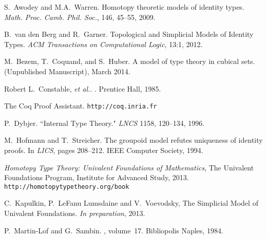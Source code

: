 \documentclass[11pt]{article}
\theoremstyle{remark}
\theoremstyle{definition}
\begin{document}

\begin{thebibliography}{300}

S.~Awodey and M.A.~Warren. Homotopy theoretic models of identity types. \emph{Math. Proc. Camb. Phil. Soc.}, 146, 45--55, 2009.

B.~van den Berg and R.~Garner. Topological and Simplicial Models of Identity Types. \emph{ACM Transactions on Computational Logic}, 13:1, 2012.

M.~Bezem, T.~Coquand, and S.~Huber.
\newblock A model of type theory in cubical sets.
\newblock (Unpublished Manuscript), March 2014.

Robert L.~Constable, \textit{et al.}.
.
\newblock Prentice Hall, 1985.

The Coq Proof Assistant.
\newblock \texttt{http://coq.inria.fr}

P.~Dybjer. ``Internal Type Theory." \emph{LNCS} 1158, 120--134, 1996.

M.~Hofmann and T.~Streicher.
\newblock The groupoid model refutes uniqueness of identity proofs.
\newblock In {\em LICS}, pages 208--212. IEEE Computer Society, 1994.

\emph{Homotopy Type Theory: Univalent Foundations of Mathematics}, The Univalent Foundations Program, Institute for Advanced Study, 2013. {\tt http://homotopytypetheory.org/book}

C.~Kapulkin, P.~LeFanu Lumsdaine and V.~Voevodsky, The Simplicial Model of Univalent Foundations. \emph{In preparation}, 2013.

%
P.~Martin-Lof and G.~Sambin.
, volume~17.
\newblock Bibliopolis Naples, 1984.



\end{thebibliography}

\end{document}
